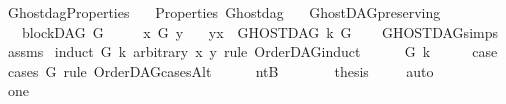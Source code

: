 %
\begin{isabellebody}%
%
%
\isadelimtheory
%
\endisadelimtheory
%
\isatagtheory
{}\isamarkupfalse%
\ Ghostdag{\isacharunderscore}{\kern0pt}Properties\isanewline
\ \ \ Properties\ Ghostdag\ \ \isanewline
{}%
\endisatagtheory
{\isafoldtheory}%
%
\isadelimtheory
%
\endisadelimtheory
%
\isadelimdocument
%
\endisadelimdocument
%
\isatagdocument
%
\isamarkuptrue%
%
\isamarkuptrue%
%
\endisatagdocument
{\isafolddocument}%
%
\isadelimdocument
%
\endisadelimdocument
{}\isamarkupfalse%
\ GhostDAG{\isacharunderscore}{\kern0pt}preserving{\isacharcolon}{\kern0pt}\isanewline
\ \ \ {\isachardoublequoteopen}blockDAG\ G{\isachardoublequoteclose}\isanewline
\ \ \ \ \ {\isachardoublequoteopen}x\ {\isasymrightarrow}\isactrlsup {\isacharplus}{\kern0pt}\isactrlbsub G\isactrlesub \ y{\isachardoublequoteclose}\isanewline
\ \ \ {\isachardoublequoteopen}{\isacharparenleft}{\kern0pt}y{\isacharcomma}{\kern0pt}x{\isacharparenright}{\kern0pt}\ {\isasymin}\ GHOSTDAG\ k\ G{\isachardoublequoteclose}\isanewline
%
\isadelimproof
\ \ %
\endisadelimproof
%
\isatagproof
{}\isamarkupfalse%
\ GHOSTDAG{\isachardot}{\kern0pt}simps\ \isamarkupfalse%
\ assms\ \isanewline
{}\isamarkupfalse%
{\isacharparenleft}{\kern0pt}induct\ G\ k\ arbitrary{\isacharcolon}{\kern0pt}\ x\ y\ rule{\isacharcolon}{\kern0pt}\ OrderDAG{\isachardot}{\kern0pt}induct\ {\isacharparenright}{\kern0pt}\isanewline
\ \ \isamarkupfalse%
\ {\isacharparenleft}{\kern0pt}{}\ G\ k{\isacharparenright}{\kern0pt}\isanewline
\ \ \isamarkupfalse%
\ \isamarkupfalse%
\ {\isacharquery}{\kern0pt}case\ \isamarkupfalse%
\ {\isacharparenleft}{\kern0pt}cases\ G\ rule{\isacharcolon}{\kern0pt}\ OrderDAG{\isacharunderscore}{\kern0pt}casesAlt{\isacharparenright}{\kern0pt}\isanewline
\ \ \ \ \isamarkupfalse%
\ ntB\isanewline
\ \ \ \ \isamarkupfalse%
\ \isamarkupfalse%
\ {\isacharquery}{\kern0pt}thesis\ \isamarkupfalse%
\ {}\ \isamarkupfalse%
\ auto\isanewline
\ \ \isamarkupfalse%
\isanewline
\ \ \ \ \isamarkupfalse%
\ one\isanewline
\ \ \ \ \isamarkupfalse%
\ \isamarkupfalse%

\end{isabellebody}
